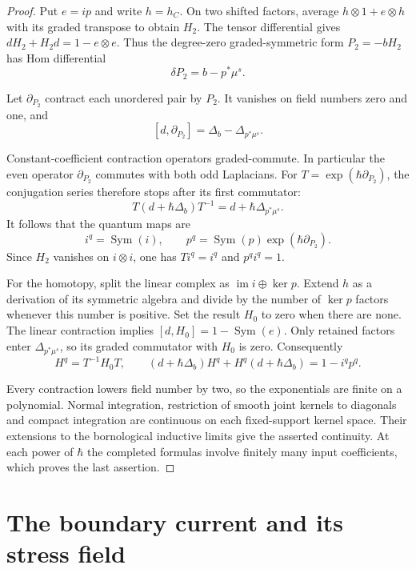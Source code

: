 \begin{proof}
Put\label{pcsm:def:pair-contraction} \(e=ip\) and write \(h=h_C\).
On two shifted factors, average
\(h\otimes1+e\otimes h\) with its graded transpose to obtain
\(H_2\). The tensor differential gives
\(dH_2+H_2d=1-e\otimes e\).
Thus the degree-zero graded-symmetric form \(P_2=-bH_2\) has
Hom differential
\[
 \delta P_2=b-p^*\mu^s.
\]

Let \(\partial_{P_2}\) contract each unordered pair by \(P_2\).
It vanishes on field numbers zero and one, and
\[
 [d,\partial_{P_2}]=\Delta_b-\Delta_{p^*\mu^s}.
\]

Constant-coefficient contraction operators graded-commute.
In particular the even operator \(\partial_{P_2}\) commutes with
both odd Laplacians. For \(T=\exp(\hbar\partial_{P_2})\),
the conjugation series therefore stops after its first commutator:
\[
 T(d+\hbar\Delta_b)T^{-1}=d+\hbar\Delta_{p^*\mu^s}.
\]
It follows that the quantum maps are
\begin{equation}\label{pcsm:quantmaps}
 i^q=\operatorname{Sym}(i),\qquad
 p^q=\operatorname{Sym}(p)\exp(\hbar\partial_{P_2}).
\end{equation}
Since \(H_2\) vanishes on \(i\otimes i\), one has
\(Ti^q=i^q\) and \(p^qi^q=1\).

For the homotopy, split the linear complex as
\(\operatorname{im}i\oplus\ker p\).
Extend \(h\) as a derivation of its symmetric algebra and divide
by the number of \(\ker p\) factors whenever this number is positive.
Set the result \(H_0\) to zero when there are none.
The linear contraction implies
\([d,H_0]=1-\operatorname{Sym}(e)\).
Only retained factors enter \(\Delta_{p^*\mu^s}\), so its graded
commutator with \(H_0\) is zero. Consequently
\[
 H^q=T^{-1}H_0T,\qquad
 (d+\hbar\Delta_b)H^q+H^q(d+\hbar\Delta_b)=1-i^qp^q.
\]

Every contraction lowers field number by two, so the exponentials are
finite on a polynomial. Normal integration, restriction of smooth
joint kernels to diagonals and compact integration are continuous
on each fixed-support kernel space.
Their extensions to the bornological inductive limits give the
asserted continuity. At each power of \(\hbar\) the completed
formulas involve finitely many input coefficients, which proves the
last assertion.
\end{proof}

\section{The boundary current and its stress field}

